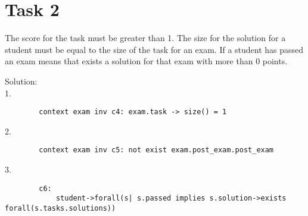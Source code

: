 \chapter{Task 2}
\begin{parlist}
	\item The score for the task must be greater than 1. The size for the solution for a student must be equal to the size of the task for an exam. If a student has passed an exam means that exists a solution for that exam with more than 0 points.
	\item Solution:\\ 1. %
	\begin{lstlisting}
		context exam inv c4: exam.task -> size() = 1
	\end{lstlisting}
	2.
	\begin{lstlisting}
		context exam inv c5: not exist exam.post_exam.post_exam 
	\end{lstlisting}
	3.
	\begin{lstlisting}
		c6:
			student->forall(s| s.passed implies s.solution->exists forall(s.tasks.solutions))
	\end{lstlisting}
\end{parlist}